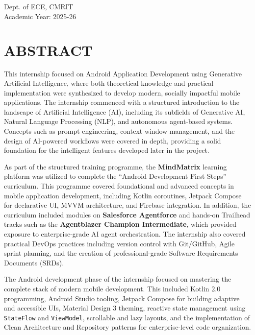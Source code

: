 \documentclass[12pt,a4paper]{report}
\begin{document}
\vspace{1cm}
\begin{flushright}
     \\
    [USN] \\
    Dept. of ECE, CMRIT \\
    Academic Year: 2025-26
\end{flushright}
\newpage

\chapter*{ABSTRACT}

This internship focused on Android Application Development using Generative Artificial Intelligence, where both theoretical knowledge and practical implementation were synthesized to develop modern, socially impactful mobile applications. The internship commenced with a structured introduction to the landscape of Artificial Intelligence (AI), including its subfields of Generative AI, Natural Language Processing (NLP), and autonomous agent-based systems. Concepts such as prompt engineering, context window management, and the design of AI-powered workflows were covered in depth, providing a solid foundation for the intelligent features developed later in the project.

\vspace{0.4cm}

As part of the structured training programme, the \textbf{MindMatrix} learning platform was utilized to complete the ``Android Development First Steps'' curriculum. This programme covered foundational and advanced concepts in mobile application development, including Kotlin coroutines, Jetpack Compose for declarative UI, MVVM architecture, and Firebase integration. In addition, the curriculum included modules on \textbf{Salesforce Agentforce} and hands-on Trailhead tracks such as the \textbf{Agentblazer Champion Intermediate}, which provided exposure to enterprise-grade AI agent orchestration. The internship also covered practical DevOps practices including version control with Git/GitHub, Agile sprint planning, and the creation of professional-grade Software Requirements Documents (SRDs).

\vspace{0.4cm}

The Android development phase of the internship focused on mastering the complete stack of modern mobile development. This included Kotlin 2.0 programming, Android Studio tooling, Jetpack Compose for building adaptive and accessible UIs, Material Design 3 theming, reactive state management using \texttt{StateFlow} and \texttt{ViewModel}, scrollable and lazy layouts, and the implementation of Clean Architecture and Repository patterns for enterprise-level code organization.
\end{document}
